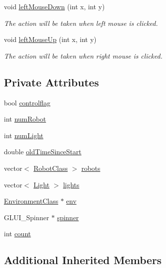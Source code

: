 \begin{DoxyCompactItemize}
void \hyperlink{classSimulation_a786d1ba31d29937f0ac6f3ea88f8a607}{left\-Mouse\-Down} (int x, int y)
\begin{DoxyCompactList}\small\item\em The action will be taken when left mouse is clicked. \end{DoxyCompactList}\item 
void \hyperlink{classSimulation_a62ef254d85017074cd521a5787b5a234}{left\-Mouse\-Up} (int x, int y)
\begin{DoxyCompactList}\small\item\em The action will be taken when right mouse is clicked. \end{DoxyCompactList}\end{DoxyCompactItemize}
\subsection*{Private Attributes}
\begin{DoxyCompactItemize}
\item 
bool \hyperlink{classSimulation_a99785aef857b01f3056bada702b53d20}{controlflag}
\item 
int \hyperlink{classSimulation_aed3fe9fceae4a68746206b7a2f9e9d7f}{num\-Robot}
\item 
int \hyperlink{classSimulation_a792ef5172ff14046a641661ce2a95041}{num\-Light}
\item 
double \hyperlink{classSimulation_a9d5a2c76548907940c15b389344365df}{old\-Time\-Since\-Start}
\item 
vector$<$ \hyperlink{classRobotClass}{Robot\-Class} $>$ \hyperlink{classSimulation_ac48312060cc6b3b973bba8c802b45bce}{robots}
\item 
vector$<$ \hyperlink{classLight}{Light} $>$ \hyperlink{classSimulation_a4f6efa5f1bb16876c98f134fe80e9278}{lights}
\item 
\hyperlink{classEnvironmentClass}{Environment\-Class} $\ast$ \hyperlink{classSimulation_adb82ccf6c2a4b78c73987857f5362a35}{env}
\item 
G\-L\-U\-I\-\_\-\-Spinner $\ast$ \hyperlink{classSimulation_ade4b147d7d59002d1ea81b60bba84b48}{spinner}
\item 
int \hyperlink{classSimulation_a5a5e26d75c6a6dee8cdfecc7669545e3}{count}
\end{DoxyCompactItemize}
\subsection*{Additional Inherited Members}


